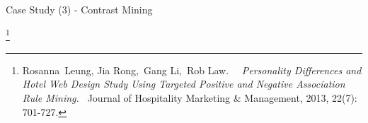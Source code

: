 \documentclass[
 size=14pt,
 paper=smartboard,  %
 mode=present, 		%
 display=slides, 	%
 style=tuliplab,  	%
 pauseslide,
 fleqn,leqno]{powerdot}
\begin{document}
\begin{slide}[toc=,bm=]{Case Study (3) - Contrast Mining}
\begin{itemize}
	\begin{figure}[htbp]
		{
		}\hspace{5mm}
		
	\end{figure}
\end{itemize}
\footnote{Rosanna Leung, Jia Rong, Gang Li, Rob Law.  
\emph{Personality Differences and Hotel Web Design Study Using Targeted Positive and Negative Association Rule Mining. }
Journal of Hospitality Marketing \& Management, 2013, 22(7): 701-727.}

\end{slide}
\end{document}
